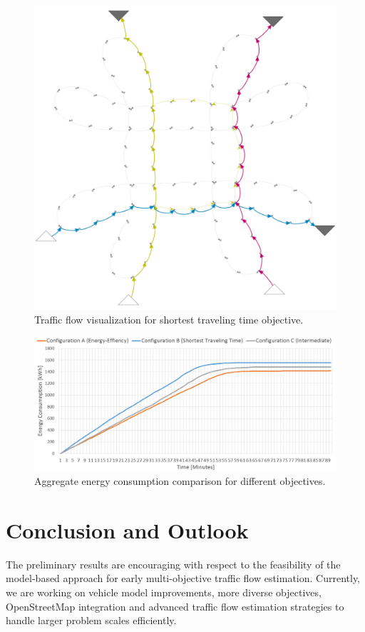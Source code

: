 \documentclass[conference]{../cls/IEEEtran}
\begin{document}
\begin{figure}[t!]
	\centering
	\includegraphics[width=0.925\columnwidth]{../gfx/graph.png}
	\caption{Traffic flow visualization for shortest traveling time objective.}
	\label{figure:graph}
\end{figure}

\begin{figure}[t!]
	\centering
	\includegraphics[width=0.925\columnwidth]{../gfx/chart.png}
	\caption{Aggregate energy consumption comparison for different objectives.}
	\label{figure:chart}
\end{figure}

\section{Conclusion and Outlook}

The preliminary results are encouraging with respect to the feasibility of the model-based approach for early multi-objective traffic flow estimation. Currently, we are working on vehicle model improvements, more diverse objectives, OpenStreetMap integration and advanced traffic flow estimation strategies to handle larger problem scales efficiently.



\end{document}
